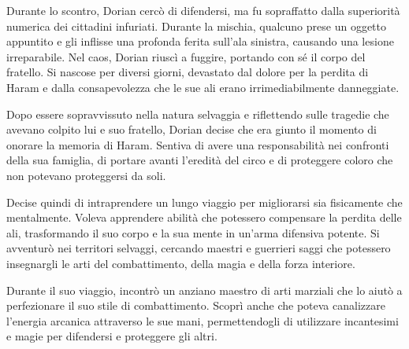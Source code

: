 Durante lo scontro, Dorian cercò di difendersi, ma fu sopraffatto dalla
superiorità numerica dei cittadini infuriati. Durante la mischia,
qualcuno prese un oggetto appuntito e gli inflisse una profonda ferita
sull'ala sinistra, causando una lesione irreparabile. Nel caos, Dorian
riuscì a fuggire, portando con sé il corpo del fratello. Si nascose per
diversi giorni, devastato dal dolore per la perdita di Haram e dalla
consapevolezza che le sue ali erano irrimediabilmente danneggiate.

Dopo essere sopravvissuto nella natura selvaggia e riflettendo sulle
tragedie che avevano colpito lui e suo fratello, Dorian decise che era
giunto il momento di onorare la memoria di Haram. Sentiva di avere una
responsabilità nei confronti della sua famiglia, di portare avanti
l'eredità del circo e di proteggere coloro che non potevano proteggersi
da soli.

Decise quindi di intraprendere un lungo viaggio per migliorarsi sia
fisicamente che mentalmente. Voleva apprendere abilità che potessero
compensare la perdita delle ali, trasformando il suo corpo e la sua
mente in un'arma difensiva potente. Si avventurò nei territori selvaggi,
cercando maestri e guerrieri saggi che potessero insegnargli le arti del
combattimento, della magia e della forza interiore.

Durante il suo viaggio, incontrò un anziano maestro di arti marziali che
lo aiutò a perfezionare il suo stile di combattimento. Scoprì anche che
poteva canalizzare l'energia arcanica attraverso le sue mani,
permettendogli di utilizzare incantesimi e magie per difendersi e
proteggere gli altri.
